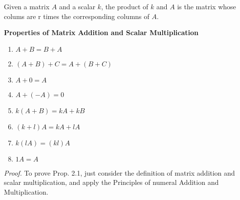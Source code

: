 \documentclass[10pt, a4paper]{article}
\begin{document}
Given a matrix $A$ and a scalar $k$, the product of $k$ and $A$ is the matrix whose colums are r times the corresponding columns of $A$.
\begin{proposition}
    \textbf{Properties of Matrix Addition and Scalar Multiplication}
    \begin{enumerate}
        \item $A + B = B + A$
        \item $(A + B) + C = A + (B + C)$
        \item $A + 0 = A$
        \item $A + (-A) = 0$
        \item $k(A + B) = kA + kB$
        \item $(k + l)A = kA + lA$
        \item $k(lA) = (kl)A$
        \item $1A = A$
    \end{enumerate}
\end{proposition}
\textit{Proof.} To prove Prop. 2.1, just consider the definition of matrix addition and scalar multiplication, and apply the Principles of numeral Addition and Multiplication.
\end{document}

